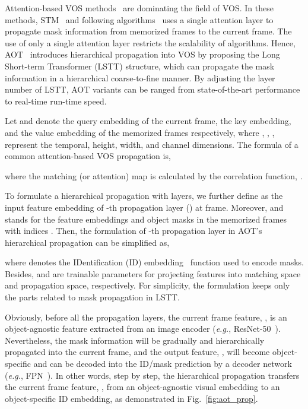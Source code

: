 \documentclass{article}
\def\eg{\emph{e.g.}}
\begin{document}
Attention-based VOS methods~\cite{spacetime,KMN,cheng2021stcn,aot} are dominating the field of VOS. In these methods, STM~\cite{spacetime} and following algorithms~\cite{KMN,cheng2021stcn} uses a single attention layer to propagate mask information from memorized frames to the current frame. The use of only a single attention layer restricts the scalability of algorithms. Hence, AOT~\cite{aot} introduces hierarchical propagation into VOS by proposing the Long Short-term Transformer (LSTT) structure, which can propagate the mask information in a hierarchical coarse-to-fine manner. By adjusting the layer number of LSTT, AOT variants can be ranged from state-of-the-art performance to real-time run-time speed.

Let  and  denote the query embedding of the current frame, the key embedding, and the value embedding of the memorized frames respectively, where , , ,  represent the temporal, height, width, and channel dimensions. The formula of a common attention-based VOS propagation is,

where the matching (or attention) map is calculated by the correlation function, . 

To formulate a hierarchical propagation with  layers, we further define  as the input feature embedding of -th propagation layer () at  frame. Moreover,  and  stands for the feature embeddings and object masks in the memorized frames with indices . Then, the formulation of -th propagation layer in AOT's hierarchical propagation can be simplified as,

where  denotes the IDentification (ID) embedding~\cite{aot} function used to encode masks. Besides,  and  are trainable parameters for projecting features into matching space and propagation space, respectively. For simplicity, the formulation keeps only the parts related to mask propagation in LSTT.

Obviously, before all the propagation layers, the current frame feature, , is an object-agnostic feature extracted from an image encoder (\eg, ResNet-50~\cite{resnet}). Nevertheless, the mask information  will be gradually and hierarchically propagated into the current frame, and the output feature, , will become object-specific and can be decoded into the ID/mask prediction by a decoder network (\eg, FPN~\cite{fpn}). In other words, step by step, the hierarchical propagation transfers the current frame feature, , from an object-agnostic visual embedding to an object-specific ID embedding, as demonstrated in Fig.~\ref{fig:aot_prop}.
\end{document}

